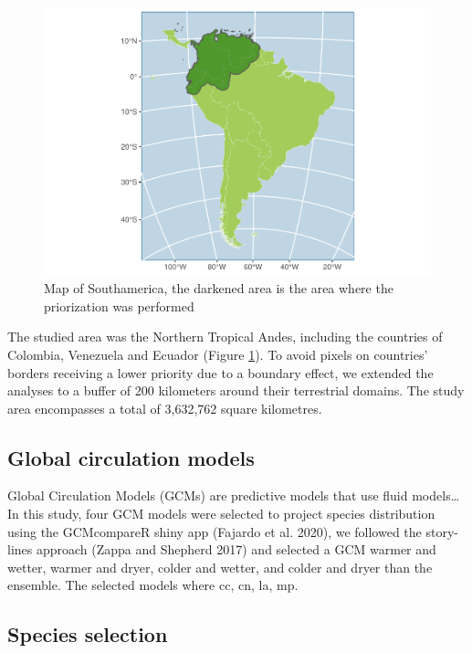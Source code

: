\documentclass[]{article}
\begin{document}
\begin{figure}

{\centering \includegraphics{TagetBasedNew_files/figure-latex/MapArea-1} 

}

\caption{Map of Southamerica, the darkened area is the area where the priorization was performed}\label{fig:MapArea}
\end{figure}

The studied area was the Northern Tropical Andes, including the countries of Colombia, Venezuela and Ecuador (Figure \ref{fig:MapArea}). To avoid pixels on countries' borders receiving a lower priority due to a boundary effect, we extended the analyses to a buffer of 200 kilometers around their terrestrial domains. The study area encompasses a total of 3,632,762 square kilometres.

\hypertarget{global-circulation-models}{%
\subsection{Global circulation models}\label{global-circulation-models}}

Global Circulation Models (GCMs) are predictive models that use fluid models\ldots{}
In this study, four GCM models were selected to project species distribution using the GCMcompareR shiny app (Fajardo et al. 2020), we followed the story-lines approach (Zappa and Shepherd 2017) and selected a GCM warmer and wetter, warmer and dryer, colder and wetter, and colder and dryer than the ensemble. The selected models where cc, cn, la, mp.

\hypertarget{species-selection}{%
\subsection{Species selection}\label{species-selection}}
\end{document}
